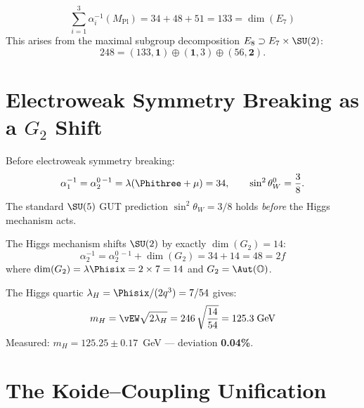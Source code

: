 \begin{theorem}
\begin{equation}
\boxed{\sum_{i=1}^{3}\alpha_i^{-1}(M_{\mathrm{Pl}}) = 34+48+51 = 133 = \dim(E_7)}
\end{equation}
This arises from the maximal subgroup decomposition
$E_8\supset E_7\times\SU(2)$:
\begin{equation}
248 = (133,\mathbf{1})\oplus(\mathbf{1},3)\oplus(56,\mathbf{2}).
\end{equation}
\end{theorem}


\section{Electroweak Symmetry Breaking as a $G_2$ Shift}
\label{sec:ewsb-g2}

\begin{theorem}
Before electroweak symmetry breaking:
\begin{equation}
\alpha_1^{-1} = \alpha_2^{0\,-1} = \lambda(\Phithree+\mu) = 34,
\qquad
\sin^2\theta_W^{0} = \frac{3}{8}.
\end{equation}
The standard $\SU(5)$ GUT prediction $\sin^2\theta_W = 3/8$
holds \emph{before} the Higgs mechanism acts.
\end{theorem}

\begin{theorem}[EWSB Shift $=\dim(G_2)$]
The Higgs mechanism shifts $\SU(2)$ by exactly $\dim(G_2)=14$:
\begin{equation}
\boxed{\alpha_2^{-1} = \alpha_2^{0\,-1} + \dim(G_2) = 34 + 14 = 48 = 2f}
\end{equation}
where $\dim(G_2)=\lambda\Phisix = 2\times 7 = 14$ and $G_2=\Aut(\mathbb{O})$.
\end{theorem}

\begin{corollary}
The Higgs quartic $\lambda_H = \Phisix/(2q^3)=7/54$ gives:
\begin{equation}
m_H = \vEW\sqrt{2\lambda_H} = 246\,\sqrt{\frac{14}{54}} = 125.3\;\mathrm{GeV}
\end{equation}
Measured: $m_H = 125.25\pm 0.17$~GeV --- deviation \textbf{0.04\%}.
\end{corollary}


\section{The Koide--Coupling Unification}
\label{sec:koide-coupling}

